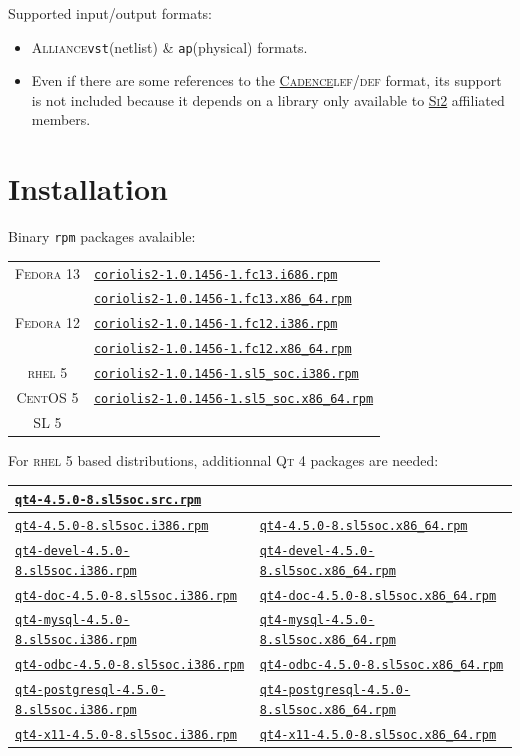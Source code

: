 \documentclass[11pt]{article}
\newcommand {\crlFtpUrl}    [1] {http://asim.lip6.fr/pub/coriolis/2.0/#1}
\newcommand {\slSocSrpmsUrl}[1] {http://ftp.lip6.fr/pub/linux/distributions/slsoc/5x/i386/SLSoC/SRPMS/#1}
\newcommand {\slRpmsiUrl}   [1] {http://ftp.lip6.fr/pub/linux/distributions/slsoc/5x/i386/i386/SL/#1}
\newcommand {\slRpmsxUrl}   [1] {http://ftp.lip6.fr/pub/linux/distributions/slsoc/5x/x86\_64/x86\_64/SL/#1}
\newcommand{\xhref}        [2]{\href{#2}{#1}}
\newcommand{\crlFtpRef}    [1]{\href{\crlFtpUrl{#1}}{\texttt{\footnotesize #1}}}
\newcommand{\slSocSrpmsRef}[1]{\href{\slSocSrpmsUrl{#1}}{\texttt{\footnotesize #1}}}
\newcommand{\slRpmsiRef}   [1]{\href{\slRpmsiUrl{#1}}{\texttt{\footnotesize #1}}}
\newcommand{\slRpmsxRef}   [1]{\href{\slRpmsxUrl{#1}}{\texttt{\footnotesize #1}}}
\newcommand{\xhref}        [2]{\htmladdnormallink{#1}{#2}}
\newcommand{\crlFtpRef}    [1]{\htmladdnormallink{#1}{\crlFtpUrl{#1}}}
\newcommand{\slSocSrpmsRef}[1]{\htmladdnormallink{#1}{\slSocSrpmsUrl{#1}}}
\newcommand{\slRpmsiRef}   [1]{\htmladdnormallink{#1}{\slRpmsiUrl{#1}}}
\newcommand{\slRpmsxRef}   [1]{\htmladdnormallink{#1}{\slRpmsxUrl{#1}}}
\newcommand {\SiII}               {\xhref{\textsc{Si2}}{http://www.si2.org/}\xspace}
\newcommand {\Cadence}            {\xhref{\textsc{Cadence}}{http://www.cadence.com/}\xspace}
\newcommand {\LEFDEF}             {\textsc{lef/def}\xspace}
\newcommand {\RHELV}              {\textsc{rhel 5}\xspace}
\newcommand {\CentOSV}            {\textsc{CentOS 5}\xspace}
\newcommand {\SLV}                {\textsc{SL 5}\xspace}
\newcommand {\FedoraXII}          {\textsc{Fedora 12}\xspace}
\newcommand {\FedoraXIII}         {\textsc{Fedora 13}\xspace}
\newcommand {\Karmik}             {\textsc{Ubuntu Karmik}\xspace}
\newcommand {\QtIV}               {\textsc{Qt 4}\xspace}
\newcommand {\rpm}                {\texttt{rpm}\xspace}
\newcommand {\Alliance}           {\textsc{Alliance}\xspace}
\newcommand {\vst}                {\texttt{vst}\xspace}
\newcommand {\ap}                 {\texttt{ap}\xspace}
\newcommand {\coriolisIIfcXIIIirpm}{\crlFtpRef{coriolis2-1.0.1456-1.fc13.i686.rpm}\xspace}
\newcommand {\coriolisIIfcXIIIxrpm}{\crlFtpRef{coriolis2-1.0.1456-1.fc13.x86\_64.rpm}\xspace}
\newcommand {\coriolisIIfcXIIirpm} {\crlFtpRef{coriolis2-1.0.1456-1.fc12.i386.rpm}\xspace}
\newcommand {\coriolisIIfcXIIxrpm} {\crlFtpRef{coriolis2-1.0.1456-1.fc12.x86\_64.rpm}\xspace}
\newcommand {\coriolisIIslVirpm}   {\crlFtpRef{coriolis2-1.0.1456-1.sl5\_soc.i386.rpm}\xspace}
\newcommand {\coriolisIIslVxrpm}   {\crlFtpRef{coriolis2-1.0.1456-1.sl5\_soc.x86\_64.rpm}\xspace}
\newcommand {\coriolisIIkarmikideb}{\crlFtpRef{coriolis2\_1.0.1456-1\_sl5\_soc\_i386.deb}\xspace}
\newcommand {\coriolisIIkarmikxdeb}{\crlFtpRef{coriolis2\_1.0.1456-1\_sl5\_soc\_x86\_64.deb}\xspace}
\newcommand {\qtIVsrpm}            {\slSocSrpmsRef{qt4-4.5.0-8.sl5soc.src.rpm}\xspace}
\newcommand {\qtIVirpm}            {\slRpmsiRef{qt4-4.5.0-8.sl5soc.i386.rpm}\xspace}
\newcommand {\qtIVdevelirpm}       {\slRpmsiRef{qt4-devel-4.5.0-8.sl5soc.i386.rpm}\xspace}
\newcommand {\qtIVdocirpm}         {\slRpmsiRef{qt4-doc-4.5.0-8.sl5soc.i386.rpm}\xspace}
\newcommand {\qtIVmysqlirpm}       {\slRpmsiRef{qt4-mysql-4.5.0-8.sl5soc.i386.rpm}\xspace}
\newcommand {\qtIVodbcirpm}        {\slRpmsiRef{qt4-odbc-4.5.0-8.sl5soc.i386.rpm}\xspace}
\newcommand {\qtIVpostgresqlirpm}  {\slRpmsiRef{qt4-postgresql-4.5.0-8.sl5soc.i386.rpm}\xspace}
\newcommand {\qtIVxXIirpm}         {\slRpmsiRef{qt4-x11-4.5.0-8.sl5soc.i386.rpm}\xspace}
\newcommand {\qtIVxrpm}            {\slRpmsxRef{qt4-4.5.0-8.sl5soc.x86\_64.rpm}\xspace}
\newcommand {\qtIVdevelxrpm}       {\slRpmsxRef{qt4-devel-4.5.0-8.sl5soc.x86\_64.rpm}\xspace}
\newcommand {\qtIVdocxrpm}         {\slRpmsxRef{qt4-doc-4.5.0-8.sl5soc.x86\_64.rpm}\xspace}
\newcommand {\qtIVmysqlxrpm}       {\slRpmsxRef{qt4-mysql-4.5.0-8.sl5soc.x86\_64.rpm}\xspace}
\newcommand {\qtIVodbcxrpm}        {\slRpmsxRef{qt4-odbc-4.5.0-8.sl5soc.x86\_64.rpm}\xspace}
\newcommand {\qtIVpostgresqlxrpm}  {\slRpmsxRef{qt4-postgresql-4.5.0-8.sl5soc.x86\_64.rpm}\xspace}
\newcommand {\qtIVxXIxrpm}         {\slRpmsxRef{qt4-x11-4.5.0-8.sl5soc.x86\_64.rpm}\xspace}
\begin{document}
 \noindent Supported input/output formats:
 \begin{itemize}
   \item \Alliance \vst (netlist) \& \ap (physical) formats.
   \item Even if there are some references to the \Cadence \LEFDEF format, its
         support is not included because it depends on a library only available
         to \SiII affiliated members.
 \end{itemize}


 \section{Installation}

 Binary \rpm packages avalaible:
 \begin{center}
 \begin{tabular}{|c|l|}
   \hline
   \FedoraXIII & \coriolisIIfcXIIIirpm  \\
               & \coriolisIIfcXIIIxrpm  \\
   \hline
   \FedoraXII  & \coriolisIIfcXIIirpm  \\
               & \coriolisIIfcXIIxrpm  \\
   \hline
   \RHELV      & \coriolisIIslVirpm  \\
   \CentOSV    & \coriolisIIslVxrpm  \\
   \SLV        &                     \\
   \hline
 \end{tabular}
 \end{center}

 \newpage

 For \RHELV based distributions, additionnal \QtIV packages are needed:

 \begin{center}
 \begin{tabular}{|l|l|}
   \hline
   \multicolumn{2}{|l|}{\qtIVsrpm} \\
   \hline
   \hline
   \qtIVirpm           & \qtIVxrpm           \\
   \qtIVdevelirpm      & \qtIVdevelxrpm      \\
   \qtIVdocirpm        & \qtIVdocxrpm        \\
   \qtIVmysqlirpm      & \qtIVmysqlxrpm      \\
   \qtIVodbcirpm       & \qtIVodbcxrpm       \\
   \qtIVpostgresqlirpm & \qtIVpostgresqlxrpm \\
   \qtIVxXIirpm        & \qtIVxXIxrpm        \\
   \hline
 \end{tabular}
 \end{center}
\end{document}
